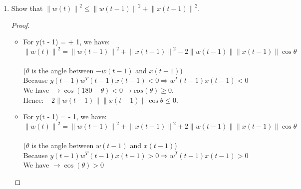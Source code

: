 \documentclass[12pt]{article}
\begin{document}
\begin{enumerate}
\begin{enumerate}
\begin{proof}
        Base case: when $t = 0$: $w^{T}(0)w^{*} \geq 0\rho \Leftrightarrow 0 \geq 0$. \\

        Induction step:  Assume $w^{T}(t)w^{*} \geq t\rho$ holds $\forall t \geq 0 $\\

        When $t = t+1 $:  $w^{T}(t + 1)w^{*} \geq (t + 1)\rho$. \\

        We have   $(t + 1)\rho = t\rho + \rho \leq w^{T}(t)w^{*} + \rho \leq w^{T}(t + 1)w^{*}$. \\
        Thus proofed
      \end{proof}
      \item Show that  $\left \| w(t) \right \|^{2} \leq \left \| w(t - 1) \right \|^{2} + \left \| x(t - 1) \right \|^{2}$.
      \begin{proof}
        \begin{itemize}
        \item For y(t - 1) = + 1, we have:
        \[ \left \| w(t) \right \|^{2} = \left \| w(t - 1) \right \|^{2} + \left \| x(t - 1) \right \|^{2} - 2\left \| w(t - 1) \right \| \left \| x(t - 1) \right \| \cos \theta \] \\
        ($\theta$ is the angle between $- w(t - 1)$ and $x(t - 1)$) \\
        Because $y(t - 1)w^{T}(t - 1)x(t - 1) < 0 \Rightarrow w^{T}(t - 1)x(t - 1) < 0 $ \\ We have $\rightarrow \cos (180 - \theta) < 0 \rightarrow cos(\theta) \geq 0$. \\

        Hence: $- 2\left \| w(t - 1) \right \| \left \| x(t - 1) \right \| \cos \theta \leq 0$. \\
        \item For y(t - 1) = - 1,  we have:
        \[ \left \| w(t) \right \|^{2} = \left \| w(t - 1) \right \|^{2} + \left \| x(t - 1) \right \|^{2} + 2\left \| w(t - 1) \right \| \left \| x(t - 1) \right \| \cos \theta \] \\
        ($\theta$ is the angle between $w(t - 1)$ and $x(t - 1)$) \\
        Because $y(t - 1)w^{T}(t - 1)x(t - 1) > 0 \Rightarrow w^{T}(t - 1)x(t - 1) > 0 $ \\ We have $\rightarrow \cos (\theta) > 0$ \\


\end{itemize}
\end{proof}
\end{enumerate}
\end{enumerate}
\end{document}
